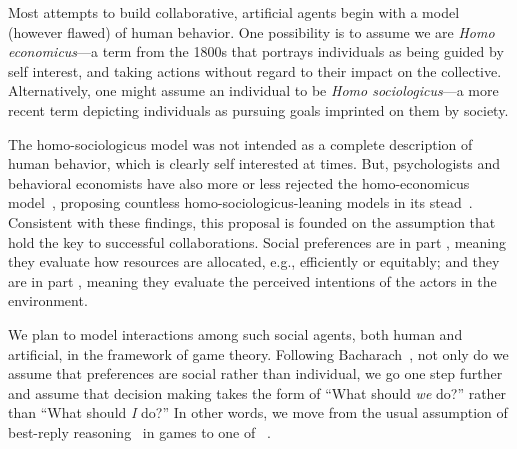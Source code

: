 Most attempts to build collaborative, artificial agents begin with a
model (however flawed) of human behavior.
%
One possibility is to assume we are \emph{Homo economicus}---a term
from the 1800s that portrays individuals as being guided by self interest,
and taking actions without regard to their impact on the collective.
Alternatively, one might assume an individual to be \emph{Homo
  sociologicus}---a more recent term depicting individuals as pursuing
goals imprinted on them by society.

The homo-sociologicus model was not intended as a complete description
of human behavior, which is clearly self interested at times.  But,
psychologists and behavioral economists have also more or less
rejected the homo-economicus model~\cite{Kahnemann, etc.}, proposing
countless homo-sociologicus-leaning models in its stead~\cite{ADD
  CITATIONS}.
%
Consistent with these findings, this proposal is founded on the
assumption that 
 hold the key to successful collaborations.
%
Social preferences are in part , meaning they
evaluate how resources are allocated, e.g., efficiently or equitably;
and they are in part , meaning they evaluate the
perceived intentions of the actors in the environment.


We plan to model interactions among such social agents, both human and
artificial, in the framework of game theory.  
%
Following Bacharach~\cite{2006}, not only do we assume that
preferences are social rather than individual, we go one step further
and assume that decision making takes the form of ``What should
\emph{we\/} do?'' rather than ``What should \emph{I\/} do?''  In other
words, we move from the usual assumption of best-reply
reasoning~\cite{Cournot} in games to one of ~\cite{TEAM REASONING: Bacharach 1999}.

